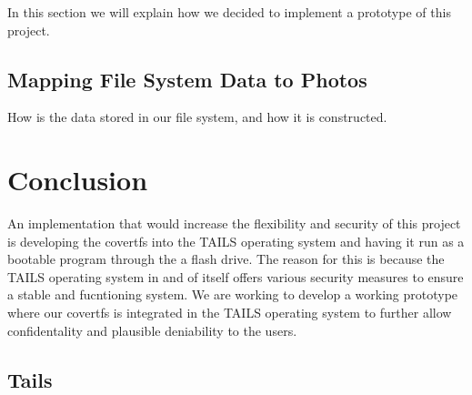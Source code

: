 \documentclass[12pt,journal,compsoc]{IEEEtran}
\begin{document}
In this section we will explain how we decided to implement a prototype of this project.





\subsection{Mapping File System Data to Photos}

How is the data stored in our file system, and how it is constructed.







\section{Conclusion}

An implementation that would increase the flexibility and security of this project is developing the covertfs into the TAILS operating system and having it run as a bootable program through the a flash drive. The reason for this is because the TAILS operating system in and of itself offers various security measures to ensure a stable and fucntioning system. We are working to develop a working prototype where our covertfs is integrated in the TAILS operating system to further allow confidentality and plausible deniability to the users. 

\subsection{Tails}
\end{document}

